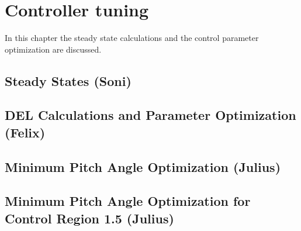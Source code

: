 \chapter{Controller tuning}
In this chapter the steady state calculations and the control parameter optimization are discussed.
\section{Steady States (Soni)} \label{steady states}


\section{DEL Calculations and Parameter Optimization (Felix)} \label{DLC 1.2 tuning}


\section{Minimum Pitch Angle Optimization (Julius)} \label{minimum pitch angle static}


\section{Minimum Pitch Angle Optimization for Control Region 1.5 (Julius)} 


